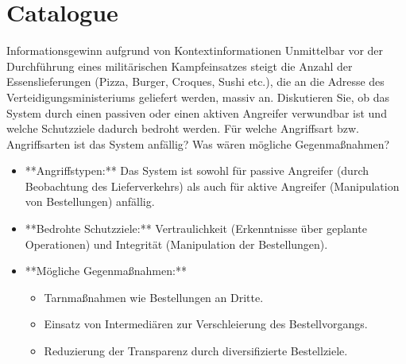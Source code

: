 \documentclass{article}
\author{Leopold Lemmermann}
\begin{document}
\createtitle

\section{Catalogue}

\setcounter{subsection}{34}
\begin{exercise}{Informationsgewinn aufgrund von Kontextinformationen}
  Unmittelbar vor der Durchführung eines militärischen Kampfeinsatzes steigt die Anzahl der Essenslieferungen (Pizza, Burger, Croques, Sushi etc.), die an die Adresse des Verteidigungsministeriums geliefert werden, massiv an. Diskutieren Sie, ob das System durch einen passiven oder einen aktiven Angreifer verwundbar ist und welche Schutzziele dadurch bedroht werden. Für welche Angriffsart bzw. Angriffsarten ist das System anfällig? Was wären mögliche Gegenmaßnahmen?

  \begin{solution}
    \begin{itemize}
      \item **Angriffstypen:** Das System ist sowohl für passive Angreifer (durch Beobachtung des Lieferverkehrs) als auch für aktive Angreifer (Manipulation von Bestellungen) anfällig.
      \item **Bedrohte Schutzziele:** Vertraulichkeit (Erkenntnisse über geplante Operationen) und Integrität (Manipulation der Bestellungen).
      \item **Mögliche Gegenmaßnahmen:**
        \begin{itemize}
          \item Tarnmaßnahmen wie Bestellungen an Dritte.
          \item Einsatz von Intermediären zur Verschleierung des Bestellvorgangs.
          \item Reduzierung der Transparenz durch diversifizierte Bestellziele.
        \end{itemize}
    \end{itemize}
  \end{solution}
\end{exercise}
\end{document}
